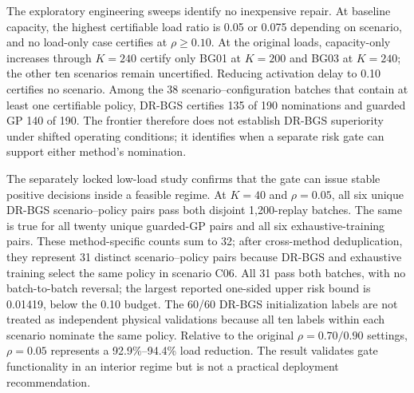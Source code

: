 \documentclass[preprint,12pt]{elsarticle}
\begin{document}
The exploratory engineering sweeps identify no inexpensive repair. At baseline capacity, the highest certifiable load ratio is 0.05 or 0.075 depending on scenario, and no load-only case certifies at $\rho\ge0.10$. At the original loads, capacity-only increases through $K=240$ certify only BG01 at $K=200$ and BG03 at $K=240$; the other ten scenarios remain uncertified. Reducing activation delay to 0.10 certifies no scenario. Among the 38 scenario--configuration batches that contain at least one certifiable policy, DR-BGS certifies 135 of 190 nominations and guarded GP 140 of 190. The frontier therefore does not establish DR-BGS superiority under shifted operating conditions; it identifies when a separate risk gate can support either method's nomination.

The separately locked low-load study confirms that the gate can issue stable positive decisions inside a feasible regime. At $K=40$ and $\rho=0.05$, all six unique DR-BGS scenario--policy pairs pass both disjoint 1,200-replay batches. The same is true for all twenty unique guarded-GP pairs and all six exhaustive-training pairs. These method-specific counts sum to 32; after cross-method deduplication, they represent 31 distinct scenario--policy pairs because DR-BGS and exhaustive training select the same policy in scenario C06. All 31 pass both batches, with no batch-to-batch reversal; the largest reported one-sided upper risk bound is 0.01419, below the 0.10 budget. The 60/60 DR-BGS initialization labels are not treated as independent physical validations because all ten labels within each scenario nominate the same policy. Relative to the original $\rho=0.70/0.90$ settings, $\rho=0.05$ represents a 92.9\%--94.4\% load reduction. The result validates gate functionality in an interior regime but is not a practical deployment recommendation.
\end{document}
